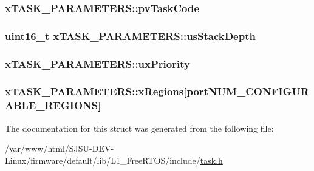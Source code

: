 \subsubsection[{\texorpdfstring{pv\+Task\+Code}{pvTaskCode}}]{ x\+T\+A\+S\+K\+\_\+\+P\+A\+R\+A\+M\+E\+T\+E\+R\+S\+::pv\+Task\+Code}\hypertarget{structxTASK__PARAMETERS_a7527993402054565cda38251c8922880}{}\label{structxTASK__PARAMETERS_a7527993402054565cda38251c8922880}
\subsubsection[{\texorpdfstring{us\+Stack\+Depth}{usStackDepth}}]{\setlength{\rightskip}{0pt plus 5cm}uint16\+\_\+t x\+T\+A\+S\+K\+\_\+\+P\+A\+R\+A\+M\+E\+T\+E\+R\+S\+::us\+Stack\+Depth}\hypertarget{structxTASK__PARAMETERS_aa07bfb2214d78ba7a30592fa7b75af18}{}\label{structxTASK__PARAMETERS_aa07bfb2214d78ba7a30592fa7b75af18}
\subsubsection[{\texorpdfstring{ux\+Priority}{uxPriority}}]{ x\+T\+A\+S\+K\+\_\+\+P\+A\+R\+A\+M\+E\+T\+E\+R\+S\+::ux\+Priority}\hypertarget{structxTASK__PARAMETERS_aa1aff14035db645e2bdcc85b3cdc9bab}{}\label{structxTASK__PARAMETERS_aa1aff14035db645e2bdcc85b3cdc9bab}
\subsubsection[{\texorpdfstring{x\+Regions}{xRegions}}]{ x\+T\+A\+S\+K\+\_\+\+P\+A\+R\+A\+M\+E\+T\+E\+R\+S\+::x\+Regions\mbox{[}{\bf port\+N\+U\+M\+\_\+\+C\+O\+N\+F\+I\+G\+U\+R\+A\+B\+L\+E\+\_\+\+R\+E\+G\+I\+O\+NS}\mbox{]}}\hypertarget{structxTASK__PARAMETERS_ae8b97c6b7a344bf09b066b0844844d66}{}\label{structxTASK__PARAMETERS_ae8b97c6b7a344bf09b066b0844844d66}


The documentation for this struct was generated from the following file\+:\begin{DoxyCompactItemize}
\item 
/var/www/html/\+S\+J\+S\+U-\/\+D\+E\+V-\/\+Linux/firmware/default/lib/\+L1\+\_\+\+Free\+R\+T\+O\+S/include/\hyperlink{task_8h}{task.\+h}\end{DoxyCompactItemize}
